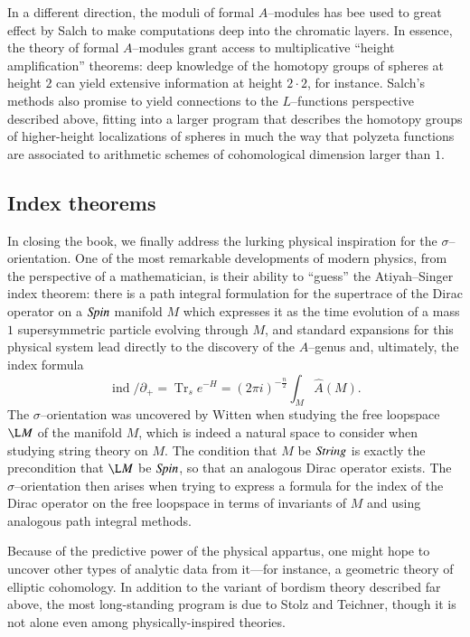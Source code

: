 In a different direction, the moduli of formal $A$--modules has bee used to great effect by Salch to make computations deep into the chromatic layers.  In essence, the theory of formal $A$--modules grant access to multiplicative ``height amplification'' theorems: deep knowledge of the homotopy groups of spheres at height $2$ can yield extensive information at height $2 \cdot 2$, for instance.  Salch's methods also promise to yield connections to the $L$--functions perspective described above, fitting into a larger program that describes the homotopy groups of higher-height localizations of spheres in much the way that polyzeta functions are associated to arithmetic schemes of cohomological dimension larger than $1$.



\subsection*{Index theorems}

In closing the book, we finally address the lurking physical inspiration for the $\sigma$--orientation.  One of the most remarkable developments of modern physics, from the perspective of a mathematician, is their ability to ``guess'' the Atiyah--Singer index theorem: there is a path integral formulation for the supertrace of the Dirac operator on a $\mathit{Spin}$ manifold $M$ which expresses it as the time evolution of a mass $1$ supersymmetric particle evolving through $M$, and standard expansions for this physical system lead directly to the discovery of the $\widehat A$--genus and, ultimately, the index formula \[\operatorname{ind} /\!\!\!\partial_+ = \operatorname{Tr}_s e^{-H} = (2 \pi i)^{-\frac{n}{2}} \int_M \widehat A(M).\]  The $\sigma$--orientation was uncovered by Witten when studying the free loopspace $\L M$ of the manifold $M$, which is indeed a natural space to consider when studying string theory on $M$.  The condition that $M$ be $\mathit{String}$ is exactly the precondition that $\L M$ be $\mathit{Spin}$, so that an analogous Dirac operator exists.  The $\sigma$--orientation then arises when trying to express a formula for the index of the Dirac operator on the free loopspace in terms of invariants of $M$ and using analogous path integral methods.

Because of the predictive power of the physical appartus, one might hope to uncover other types of analytic data from it---for instance, a geometric theory of elliptic cohomology.  In addition to the variant of bordism theory described far above, the most long-standing program is due to Stolz and Teichner, though it is not alone even among physically-inspired theories.

